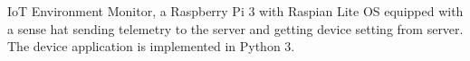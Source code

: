 IoT Environment Monitor, a Raspberry Pi 3 with Raspian Lite OS equipped with a sense hat sending telemetry to the server and getting device setting from server. The device application is implemented in Python 3.